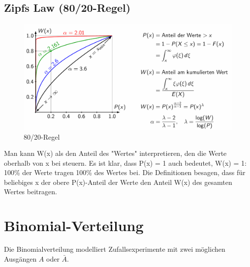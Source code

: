 \documentclass[../Main.tex]{subfiles}
\begin{document}
\subsection{Zipfs Law (80/20-Regel)}

\begin{figure}[H]
    \centering
    \includegraphics[width=0.75\linewidth]{Images/80-20.png}
    \caption{80/20-Regel}
\end{figure}
Man kann W(x) als den Anteil des "Wertes" interpretieren, den die Werte oberhalb von x bei
steuern. Es ist klar, dass P(x) = 1 auch bedeutet, W(x) = 1: 100\% der Werte tragen 100\% des
 Wertes bei. Die Definitionen besagen, dass für beliebiges x der obere P(x)-Anteil der Werte den
 Anteil W(x) des gesamten Wertes beitragen.


\newpage
\section{Binomial-Verteilung}
Die Binomialverteilung modelliert Zufallsexperimente mit zwei möglichen Ausgängen \(A\) oder \(\bar{A}\).
\end{document}
